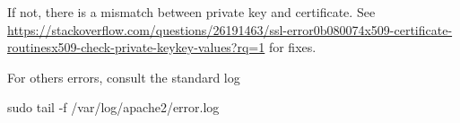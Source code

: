 \documentclass[
]{book}
\newenvironment{Shaded}{\begin{snugshade}}{\end{snugshade}}
\newcommand{\AttributeTok}[1]{\textcolor[rgb]{0.77,0.63,0.00}{#1}}
\newcommand{\FunctionTok}[1]{\textcolor[rgb]{0.00,0.00,0.00}{#1}}
\newcommand{\NormalTok}[1]{#1}
\begin{document}
If not, there is a mismatch between private key and certificate. See \url{https://stackoverflow.com/questions/26191463/ssl-error0b080074x509-certificate-routinesx509-check-private-keykey-values?rq=1} for fixes.

For others errors, consult the standard log

\begin{Shaded}
\begin{Highlighting}[]
\FunctionTok{sudo}\NormalTok{ tail }\AttributeTok{{-}f}\NormalTok{ /var/log/apache2/error.log}
\end{Highlighting}
\end{Shaded}


  
\end{document}
